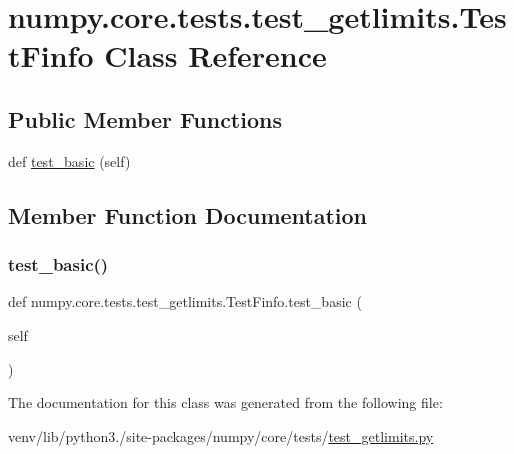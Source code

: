 \hypertarget{classnumpy_1_1core_1_1tests_1_1test__getlimits_1_1TestFinfo}{}\section{numpy.\+core.\+tests.\+test\+\_\+getlimits.\+Test\+Finfo Class Reference}
\label{classnumpy_1_1core_1_1tests_1_1test__getlimits_1_1TestFinfo}
\subsection*{Public Member Functions}
\begin{DoxyCompactItemize}
\item 
def \hyperlink{classnumpy_1_1core_1_1tests_1_1test__getlimits_1_1TestFinfo_ad57849e69993cbedf0d187905320317e}{test\+\_\+basic} (self)
\end{DoxyCompactItemize}


\subsection{Member Function Documentation}
\mbox{\label{classnumpy_1_1core_1_1tests_1_1test__getlimits_1_1TestFinfo_ad57849e69993cbedf0d187905320317e}} 
\subsubsection{\texorpdfstring{test\+\_\+basic()}{test\_basic()}}
{\footnotesize\ttfamily def numpy.\+core.\+tests.\+test\+\_\+getlimits.\+Test\+Finfo.\+test\+\_\+basic (\begin{DoxyParamCaption}\item[{}]{self }\end{DoxyParamCaption})}



The documentation for this class was generated from the following file\+:\begin{DoxyCompactItemize}
\item 
venv/lib/python3./site-\/packages/numpy/core/tests/\hyperlink{test__getlimits_8py}{test\+\_\+getlimits.\+py}\end{DoxyCompactItemize}
